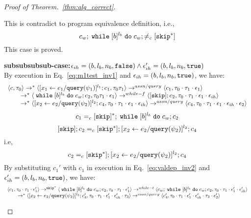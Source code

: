 \begin{proof}[Proof of Theorem.~\ref{thm:alg_correct}]
\begin{case}
\begin{subcase}
\begin{subsubcase}
\begin{subsubsubcase}
\begin{subproof}
\begin{enumerate}
\[\]
This is contradict to program equivalence definition, i.e.,
\[
  c_w;\;\mathtt{while}\; [b]^{l_b} \;\mathtt{do}\; c_w; \neq_c [\mathtt{skip}^*]
\]
This case is proved.
%
 \end{enumerate}
%
\textbf{subsubsubsub-case:}$\mathtt{\epsilon}_{ih} = (b, l_b, n_b, \mathtt{false}) \land \mathtt{\epsilon}_{ih}' = (b, l_b, n_b, \mathtt{true})$
\\
By execution in Eq.~\ref{eq:m1test_inv1} and $\mathtt{\epsilon}_{ih} = (b, l_b, n_b, \mathtt{true})$, we have:
\[
  \begin{array}{l}   
  \langle {c}, \mathtt{\tau}_0 \rangle \rightarrow^{*} 
  \langle [\mathrel{ {x}_1 \leftarrow e_1 / {\tt query}(\psi_1) }]^{l_1} ; {c}_1, \mathtt{\tau}_0 \mathtt{\tau}_1 \rangle  
  \rightarrow^{assn/query}
  \langle c_1, \mathtt{\tau}_0 \cdot \mathtt{\tau}_1 \cdot \mathtt{\epsilon}_1 \rangle 
  \\
  \qquad \rightarrow^{*} 
  \langle \;\mathtt{while}\; [b]^{l_b} \;\mathtt{do}\; c_w;{c}_2, 
  \mathtt{\tau}_0 \mathtt{\tau}_1 \cdot \mathtt{\epsilon}_1 \rangle 
  \rightarrow^{while-f} 
  \langle [\mathtt{skip}]; c_2, \mathtt{\tau}_0 \cdot \mathtt{\tau}_1 \cdot \mathtt{\epsilon}_1 \cdot \mathtt{\epsilon}_{ih} \rangle 
  \\
  \qquad \rightarrow^{*} 
  \langle [\mathrel{ {x}_2 \leftarrow e_2 / {\tt query}(\psi_2) }]^{l_2};{c}_4, 
  \mathtt{\tau}_0 \cdot \mathtt{\tau}_1 \cdot \mathtt{\epsilon}_1 \cdot \mathtt{\epsilon}_{ih} \rangle 
  \rightarrow^{assn/query} 
  \langle {c}_4,  \mathtt{\tau}_0 \cdot \mathtt{\tau}_1 \cdot \mathtt{\epsilon}_1 \cdot \mathtt{\epsilon}_{ih} \cdot \mathtt{\epsilon}_2 \rangle 
  \end{array}
\]
%
\[
  c_1 =_c [\mathtt{skip}]{}^*; \;\mathtt{while}\; [b]^{l_b} \;\mathtt{do}\; c_w;{c}_2
\]
% 
\[
  [\mathtt{skip}]; c_2 =_c [\mathtt{skip}^*];[\mathrel{ {x}_2 \leftarrow e_2 / {\tt query}(\psi_2) }]^{l_2};{c}_4
\]
i.e,
\[
  c_2 =_c [\mathtt{skip}^*];[\mathrel{ {x}_2 \leftarrow e_2 / {\tt query}(\psi_2) }]^{l_2};{c}_4
\]
%
By substituting $c_1'$ with $c_1$ in execution in Eq.~\ref{eq:valdep_inv2} and $\mathtt{\epsilon}_{ih}' = (b, l_b, n_b, \mathtt{true})$, we have:
  \begin{equation}
  \label{eq:m1testwhile_inv2}
  \begin{array}{l}   
  \config{c_1, \vtrace_0 \cdot \vtrace_1 \cdot \event_1'} 
  \rightarrow^{\eskip^*} 
  \config{\ewhile [b]^{l_b} \edo c_w;{c}_2, \vtrace_0 \cdot \vtrace_1 \cdot \event_1'} 
  \rightarrow^{while-t} 
  \config{c_w;\ewhile [b]^{l_b} \edo c_w;c_2, \vtrace_0 \cdot \vtrace_1 \cdot \event_1' \cdot \event_{ih}'} 
  \\
  \qquad \rightarrow^{*} 
  \config{[\assign{{x}_2}{\expr_2 / \query(\qexpr_2)}]^{l_2};{c}_4', 
  \vtrace_0 \cdot \vtrace_1 \cdot \event_1' \cdot \event_{ih}' \cdot \trace_3}
  \rightarrow^{assn/query} 
  \config{{c}_4',  \vtrace_0 \cdot \vtrace_1 \cdot \event_1' \cdot \event_{ih}' \cdot \trace_3 \cdot \event_2'} 
\end{array}

\end{equation}
\end{subproof}
\end{subsubsubcase}
\end{subsubcase}
\end{subcase}
\end{case}
\end{proof}
